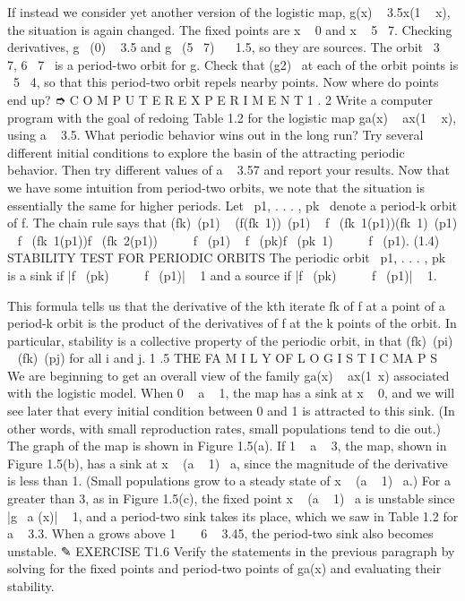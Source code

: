 \documentclass{article}
\begin{document}
If instead we consider yet another version of the logistic map, g(x)  
3.5x(1   x), the situation is again changed. The fixed points are x   0 and
x   5  7. Checking derivatives, g  (0)   3.5 and g  (5  7)    1.5, so they are
sources. The orbit  3  7, 6  7  is a period-two orbit for g. Check that (g2)  at each
of the orbit points is  5  4, so that this period-two orbit repels nearby points.
Now where do points end up?
➮ C O M P U T E R E X P E R I M E N T 1 . 2
Write a computer program with the goal of redoing Table 1.2 for the logistic
map ga(x)   ax(1   x), using a   3.5. What periodic behavior wins out in the
long run? Try several different initial conditions to explore the basin of the
attracting periodic behavior. Then try different values of a   3.57 and report
your results.
Now that we have some intuition from period-two orbits, we note that
the situation is essentially the same for higher periods. Let  p1, . . . , pk  denote a
period-k orbit of f. The chain rule says that
(fk) (p1)   (f(fk 1)) (p1)
  f  (fk 1(p1))(fk 1) (p1)
  f  (fk 1(p1))f  (fk 2(p1))       f  (p1)
  f  (pk)f  (pk 1)       f  (p1). (1.4)
STABILITY TEST FOR PERIODIC ORBITS
The periodic orbit  p1, . . . , pk  is a sink if
|f  (pk)       f  (p1)|   1
and a source if
|f  (pk)       f  (p1)|   1.

This formula tells us that the derivative of the kth iterate fk of f at a point
of a period-k orbit is the product of the derivatives of f at the k points of the
orbit. In particular, stability is a collective property of the periodic orbit, in that
(fk) (pi)   (fk) (pj) for all i and j.
1 .5 THE FA M I L Y OF L O G I S T I C MA P S
We are beginning to get an overall view of the family ga(x)   ax(1 x) associated
with the logistic model. When 0   a   1, the map has a sink at x   0, and we
will see later that every initial condition between 0 and 1 is attracted to this sink.
(In other words, with small reproduction rates, small populations tend to die out.)
The graph of the map is shown in Figure 1.5(a).
If 1   a   3, the map, shown in Figure 1.5(b), has a sink at x   (a   1)  a,
since the magnitude of the derivative is less than 1. (Small populations grow to
a steady state of x   (a   1)  a.) For a greater than 3, as in Figure 1.5(c), the
fixed point x   (a   1)  a is unstable since |g 
a (x)|   1, and a period-two sink
takes its place, which we saw in Table 1.2 for a   3.3. When a grows above
1  
 
6   3.45, the period-two sink also becomes unstable.
✎ EXERCISE T1.6
Verify the statements in the previous paragraph by solving for the fixed
points and period-two points of ga(x) and evaluating their stability.
\end{document}
